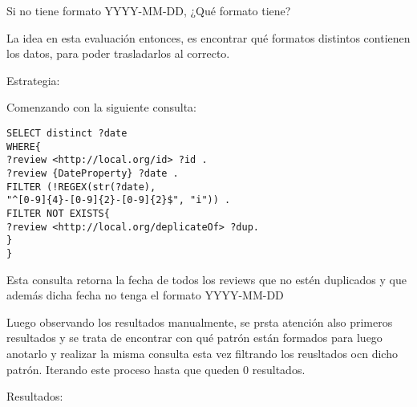 Si no tiene formato YYYY-MM-DD, ¿Qué formato tiene?

La idea en esta evaluación entonces, es encontrar qué formatos distintos contienen los datos, para poder trasladarlos al correcto.

Estrategia:

Comenzando con la siguiente consulta:


\begin{lstlisting}[frame=single]  
SELECT distinct ?date 
WHERE{
?review <http://local.org/id> ?id .
?review {DateProperty} ?date .
FILTER (!REGEX(str(?date), 
"^[0-9]{4}-[0-9]{2}-[0-9]{2}$", "i")) .
FILTER NOT EXISTS{
?review <http://local.org/deplicateOf> ?dup.
}
}
\end{lstlisting}



Esta consulta retorna la fecha de todos los reviews que no estén duplicados y que además dicha fecha no tenga el formato YYYY-MM-DD

Luego observando los resultados manualmente, se prsta atención also primeros resultados y se trata de encontrar con qué patrón están formados 
para luego anotarlo y realizar la misma consulta esta vez filtrando los reusltados ocn dicho patrón. Iterando este proceso hasta que 
queden 0 resultados.

Resultados:

